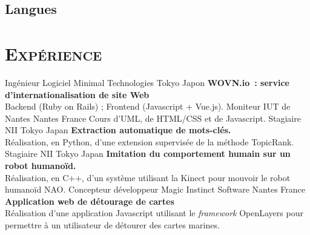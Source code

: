 \documentclass[10pt, a4paper]{moderncv}
\begin{document}
    \subsection{Langues}

  \section{\textsc{Expérience}}
            {Ingénieur Logiciel}
            {Minimal Technologies}
            {Tokyo}
            {Japon}
            {\textbf{WOVN.io~: service d'internationalisation de site Web}\\
             Backend (Ruby on Rails) ; Frontend (Javascript + Vue.js).}
            {Moniteur}                                    %
            {IUT de Nantes}                               %
            {Nantes}                                      %
            {France}                                      %
            {Cours d'UML, de HTML/CSS et de Javascript.}  %
            {Stagiaire}
            {NII}
            {Tokyo}
            {Japan}
            {\textbf{Extraction automatique de mots-clés.}\\
             Réalisation, en Python, d'une extension supervisée de la méthode
             TopicRank.}
            {Stagiaire}
            {NII}
            {Tokyo}
            {Japan}
            {\textbf{Imitation du comportement humain sur un robot humanoïd.}\\
             Réalisation, en C++, d'un système utilisant la Kinect pour mouvoir
             le robot humanoïd NAO.}
            {Concepteur développeur}
            {Magic Instinct Software}
            {Nantes}
            {France}
            {\textbf{Application web de détourage de cartes}\\
             Réalisation d'une application Javascript utilisant le
             \textit{framework} OpenLayers pour permettre à un utilisateur de
             détourer des cartes marines.}
\end{document}
